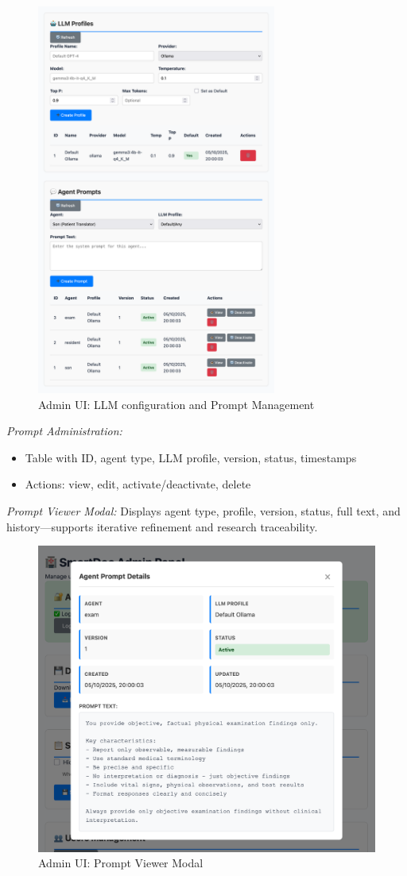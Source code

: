 \begin{figure}[h]
  \centering
  \includegraphics[width=0.7\textwidth]{figures/ui/ui_set3.png}
  \caption{Admin UI: LLM configuration and Prompt Management}
  \label{fig:ui-set3}
\end{figure}

\textit{Prompt Administration:}
\begin{itemize}
  \item Table with ID, agent type, LLM profile, version, status, timestamps
  \item Actions: view, edit, activate/deactivate, delete
\end{itemize}

\textit{Prompt Viewer Modal:} Displays agent type, profile, version, status, full text, and history—supports iterative refinement and research traceability.

\begin{figure}
    \centering
    \includegraphics[width=0.7\linewidth]{figures/ui/ui_set4.png}
    \caption{Admin UI: Prompt Viewer Modal}
    \label{fig:ui-set4}
\end{figure}

